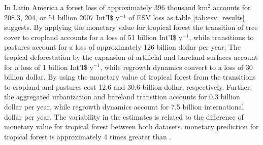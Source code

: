 		In Latin America a forest loss of approximately 396 thousand km$^2$ accounts for 208.3, 204, or 51 billion 2007 Int'I\$ y$^{-1}$ of \ac{ESV} loss as table \ref{tab:esv_results} suggests. By applying the \citeauthor{Costanza2014} monetary value for tropical forest the transition of tree cover to cropland accounts for a loss of 51 billion Int'I\$ y$^{-1}$, while transitions to pastures account for a loss of approximately 126 billion dollar per year. The tropical deforestation by the expansion of artificial and bareland surfaces account for a loss of 1 billion Int'I\$ y$^{-1}$, while regrowth dynamics convert to a loss of 30 billion dollar. By using the monetary value of tropical forest from \citeauthor{Siikamaki2015} the transitions to cropland and pastures cost 12.6 and 30.6 billion dollar, respectively. Further, the aggregated urbanization and bareland transition accounts for 0.3 billion dollar per year, while regrowth dynamics account for 7.5 billion international dollar per year. The variability in the estimates is related to the difference of monetary value for tropical forest between both datasets. \citeauthor{Costanza2014} monetary prediction for tropical forest is approximately 4 times greater than \citeauthor{Siikamaki2015}. 

